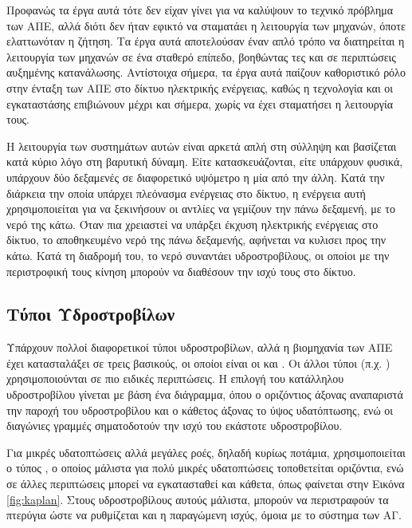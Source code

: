 \documentclass[12pt]{report}
\begin{document}
Προφανώς τα έργα αυτά τότε δεν είχαν γίνει για να καλύψουν το τεχνικό πρόβλημα των ΑΠΕ, αλλά διότι δεν ήταν εφικτό να
σταματάει η λειτουργία των μηχανών, όποτε ελαττωνόταν η ζήτηση. Τα έργα αυτά αποτελούσαν έναν απλό τρόπο να διατηρείται η λειτουργία των μηχανών σε ένα σταθερό επίπεδο, βοηθώντας τες και σε περιπτώσεις αυξημένης κατανάλωσης.
Αντίστοιχα σήμερα, τα έργα αυτά παίζουν καθοριστικό ρόλο στην ένταξη των ΑΠΕ στο δίκτυο ηλεκτρικής ενέργειας, καθώς η τεχνολογία και οι εγκαταστάσης επιβιώνουν μέχρι και σήμερα, χωρίς να έχει σταματήσει η λειτουργία τους.

Η λειτουργία των συστημάτων αυτών είναι αρκετά απλή στη σύλληψη και βασίζεται κατά κύριο λόγο στη βαρυτική δύναμη. Είτε κατασκευάζονται, είτε υπάρχουν φυσικά, υπάρχουν δύο δεξαμενές σε διαφορετικό υψόμετρο η μία από την άλλη.
Κατά την διάρκεια την οποία υπάρχει πλεόνασμα ενέργειας στο δίκτυο, η ενέργεια αυτή χρησιμοποιείται για να ξεκινήσουν οι αντλίες να γεμίζουν την πάνω δεξαμενή, με το νερό της κάτω. Όταν πια χρειαστεί να υπάρξει έκχυση 
ηλεκτρικής ενέργειας στο δίκτυο, το αποθηκευμένο νερό της πάνω δεξαμενής, αφήνεται να κυλισει προς την κάτω. Κατά τη διαδρομή του, το νερό συναντάει υδροστροβίλους, οι οποίοι με την περιστροφική τους κίνηση μπορούν
να διαθέσουν την ισχύ τους στο δίκτυο. 

\subsection{Τύποι Υδροστροβίλων}
Υπάρχουν πολλοί διαφορετικοί τύποι υδροστροβίλων, αλλά η βιομηχανία των ΑΠΕ έχει κατασταλάξει σε τρεις βασικούς, οι οποίοι είναι οι {} και {}. Οι άλλοι τύποι 
(π.χ. {}) χρησιμοποιούνται σε πιο ειδικές περιπτώσεις. Η επιλογή του κατάλληλου υδροστροβίλου γίνεται με βάση ένα διάγραμμα, όπου ο οριζόντιος άξονας αναπαριστά την παροχή του υδροστροβίλου
και ο κάθετος άξονας το ύψος υδατόπτωσης, ενώ οι διαγώνιες γραμμές σηματοδοτούν την ισχύ του εκάστοτε υδροστροβίλου.

Για μικρές υδατοπτώσεις αλλά μεγάλες ροές, δηλαδή κυρίως ποτάμια, χρησιμοποιείται ο τύπος {}, ο οποίος μάλιστα για πολύ μικρές υδατοπτώσεις τοποθετείται οριζόντια, 
ενώ σε άλλες περιπτώσεις μπορεί να εγκατασταθεί και κάθετα, όπως φαίνεται στην Εικόνα \ref{fig:kaplan}. Στους υδροστροβίλους αυτούς μάλιστα, μπορούν να περιστραφούν τα πτερύγια ώστε να ρυθμίζεται και η παραγώμενη ισχύς, όμοια με
το σύστημα {} των ΑΓ.
\end{document}
